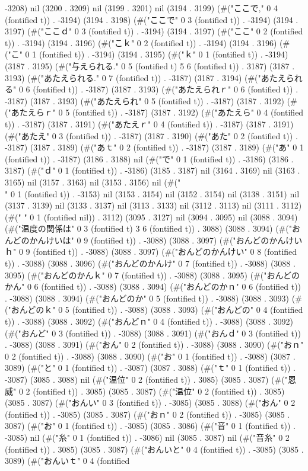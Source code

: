 -3208) nil (3200 . 3209) nil (3199 . 3201) nil (3194 . 3199) (#("ここで," 0 4 (fontified t)) . -3194) (3194 . 3198) (#("ここで" 0 3 (fontified t)) . -3194) (3194 . 3197) (#("ここｄ" 0 3 (fontified t)) . -3194) (3194 . 3197) (#("ここ" 0 2 (fontified t)) . -3194) (3194 . 3196) (#("こｋ" 0 2 (fontified t)) . -3194) (3194 . 3196) (#("こ" 0 1 (fontified t)) . -3194) (3194 . 3195) (#("ｋ" 0 1 (fontified t)) . -3194) (3187 . 3195) (#("与えられる." 0 5 (fontified t) 5 6 (fontified t)) . 3187) (3187 . 3193) (#("あたえられる." 0 7 (fontified t)) . -3187) (3187 . 3194) (#("あたえられる" 0 6 (fontified t)) . -3187) (3187 . 3193) (#("あたえられｒ" 0 6 (fontified t)) . -3187) (3187 . 3193) (#("あたえられ" 0 5 (fontified t)) . -3187) (3187 . 3192) (#("あたえらｒ" 0 5 (fontified t)) . -3187) (3187 . 3192) (#("あたえら" 0 4 (fontified t)) . -3187) (3187 . 3191) (#("あたえｒ" 0 4 (fontified t)) . -3187) (3187 . 3191) (#("あたえ" 0 3 (fontified t)) . -3187) (3187 . 3190) (#("あた" 0 2 (fontified t)) . -3187) (3187 . 3189) (#("あｔ" 0 2 (fontified t)) . -3187) (3187 . 3189) (#("あ" 0 1 (fontified t)) . -3187) (3186 . 3188) nil (#("で" 0 1 (fontified t)) . -3186) (3186 . 3187) (#("ｄ" 0 1 (fontified t)) . -3186) (3185 . 3187) nil (3164 . 3169) nil (3163 . 3165) nil (3157 . 3163) nil (3153 . 3156) nil (#("\\" 0 1 (fontified t)) . -3153) nil (3153 . 3154) nil (3152 . 3154) nil (3138 . 3151) nil (3137 . 3139) nil (3133 . 3137) nil (3113 . 3133) nil (3112 . 3113) nil (3111 . 3112) (#(" " 0 1 (fontified nil)) . 3112) (3095 . 3127) nil (3094 . 3095) nil (3088 . 3094) (#("温度の関係は" 0 3 (fontified t) 3 6 (fontified t)) . 3088) (3088 . 3094) (#("おんどのかんけいは" 0 9 (fontified t)) . -3088) (3088 . 3097) (#("おんどのかんけいｈ" 0 9 (fontified t)) . -3088) (3088 . 3097) (#("おんどのかんけい" 0 8 (fontified t)) . -3088) (3088 . 3096) (#("おんどのかんけ" 0 7 (fontified t)) . -3088) (3088 . 3095) (#("おんどのかんｋ" 0 7 (fontified t)) . -3088) (3088 . 3095) (#("おんどのかん" 0 6 (fontified t)) . -3088) (3088 . 3094) (#("おんどのかｎ" 0 6 (fontified t)) . -3088) (3088 . 3094) (#("おんどのか" 0 5 (fontified t)) . -3088) (3088 . 3093) (#("おんどのｋ" 0 5 (fontified t)) . -3088) (3088 . 3093) (#("おんどの" 0 4 (fontified t)) . -3088) (3088 . 3092) (#("おんどｎ" 0 4 (fontified t)) . -3088) (3088 . 3092) (#("おんど" 0 3 (fontified t)) . -3088) (3088 . 3091) (#("おんｄ" 0 3 (fontified t)) . -3088) (3088 . 3091) (#("おん" 0 2 (fontified t)) . -3088) (3088 . 3090) (#("おｎ" 0 2 (fontified t)) . -3088) (3088 . 3090) (#("お" 0 1 (fontified t)) . -3088) (3087 . 3089) (#("と" 0 1 (fontified t)) . -3087) (3087 . 3088) (#("ｔ" 0 1 (fontified t)) . -3087) (3085 . 3088) nil (#("温位" 0 2 (fontified t)) . 3085) (3085 . 3087) (#("恩威" 0 2 (fontified t)) . 3085) (3085 . 3087) (#("温位" 0 2 (fontified t)) . 3085) (3085 . 3087) (#("おんい" 0 3 (fontified t)) . -3085) (3085 . 3088) (#("おん" 0 2 (fontified t)) . -3085) (3085 . 3087) (#("おｎ" 0 2 (fontified t)) . -3085) (3085 . 3087) (#("お" 0 1 (fontified t)) . -3085) (3085 . 3086) (#("音" 0 1 (fontified t)) . -3085) nil (#("糸" 0 1 (fontified t)) . -3086) nil (3085 . 3087) nil (#("音糸" 0 2 (fontified t)) . 3085) (3085 . 3087) (#("おんいと" 0 4 (fontified t)) . -3085) (3085 . 3089) (#("おんいｔ" 0 4 (fontified 